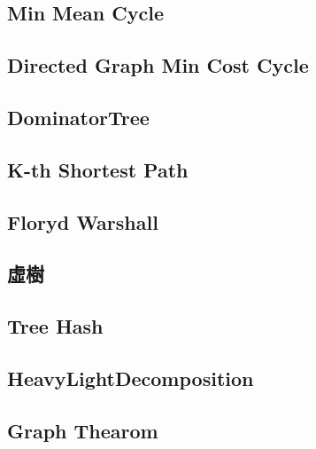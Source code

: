 \documentclass[a4paper,10pt,twocolumn,oneside]{article}
\begin{document}
\subsection{Min Mean Cycle}


\subsection{Directed Graph Min Cost Cycle}


\subsection{DominatorTree}


\subsection{K-th Shortest Path}


\subsection{Floryd Warshall}


%

\subsection{虛樹}


\subsection{Tree Hash}
%


\subsection{HeavyLightDecomposition}


\subsection{Graph Thearom}

\end{document}
